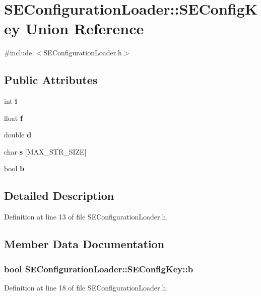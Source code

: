 \section{S\+E\+Configuration\+Loader\+:\+:S\+E\+Config\+Key Union Reference}
\label{union_s_e_configuration_loader_1_1_s_e_config_key}


{\ttfamily \#include $<$S\+E\+Configuration\+Loader.\+h$>$}

\subsection*{Public Attributes}
\begin{DoxyCompactItemize}
\item 
int {\bf i}
\item 
float {\bf f}
\item 
double {\bf d}
\item 
char {\bf s} [M\+A\+X\+\_\+\+S\+T\+R\+\_\+\+S\+I\+Z\+E]
\item 
bool {\bf b}
\end{DoxyCompactItemize}


\subsection{Detailed Description}


Definition at line 13 of file S\+E\+Configuration\+Loader.\+h.



\subsection{Member Data Documentation}
\subsubsection[{b}]{\setlength{\rightskip}{0pt plus 5cm}bool S\+E\+Configuration\+Loader\+::\+S\+E\+Config\+Key\+::b}\label{union_s_e_configuration_loader_1_1_s_e_config_key_a430409f997fd6215f209b0b8140065d1}


Definition at line 18 of file S\+E\+Configuration\+Loader.\+h.

